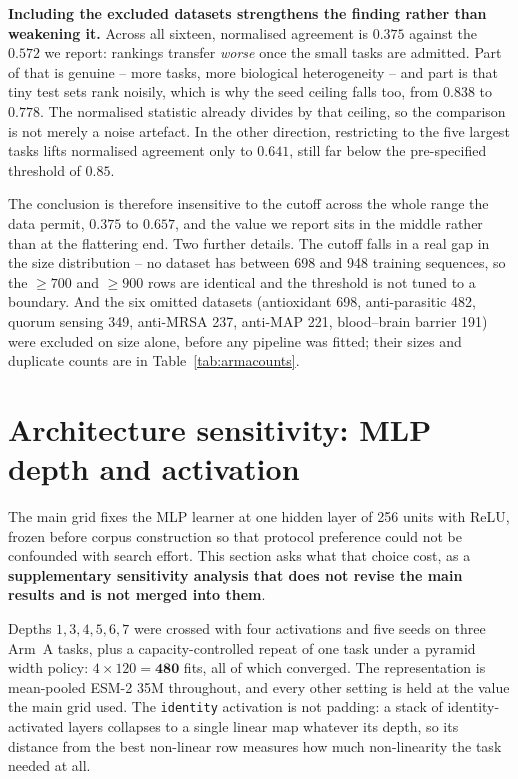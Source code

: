 \documentclass[11pt,a4paper]{article}
\begin{document}
\textbf{Including the excluded datasets strengthens the finding rather than weakening it.}
Across all sixteen, normalised agreement is $0.375$ against the $0.572$ we report: rankings
transfer \emph{worse} once the small tasks are admitted. Part of that is genuine -- more
tasks, more biological heterogeneity -- and part is that tiny test sets rank noisily, which
is why the seed ceiling falls too, from $0.838$ to $0.778$. The normalised statistic already
divides by that ceiling, so the comparison is not merely a noise artefact. In the other
direction, restricting to the five largest tasks lifts normalised agreement only to
$0.641$, still far below the pre-specified threshold of $0.85$.

The conclusion is therefore insensitive to the cutoff across the whole range the data
permit, $0.375$ to $0.657$, and the value we report sits in the middle rather than at the
flattering end. Two further details. The cutoff falls in a real gap in the size
distribution -- no dataset has between 698 and 948 training sequences, so the $\geq 700$ and
$\geq 900$ rows are identical and the threshold is not tuned to a boundary. And the six
omitted datasets (antioxidant 698, anti-parasitic 482, quorum sensing 349, anti-MRSA 237,
anti-MAP 221, blood--brain barrier 191) were excluded on size alone, before any pipeline was
fitted; their sizes and duplicate counts are in Table~\ref{tab:armacounts}.

\section{Architecture sensitivity: MLP depth and activation}
\label{sec:ablation}

The main grid fixes the MLP learner at one hidden layer of 256 units with ReLU, frozen
before corpus construction so that protocol preference could not be confounded with search
effort. This section asks what that choice cost, as a \textbf{supplementary sensitivity
analysis that does not revise the main results and is not merged into them}.

Depths $1, 3, 4, 5, 6, 7$ were crossed with four activations and five seeds on three Arm~A
tasks, plus a capacity-controlled repeat of one task under a pyramid width policy:
$4 \times 120 = \mathbf{480}$ fits, all of which converged. The representation is
mean-pooled ESM-2 35M throughout, and every other setting is held at the value the main
grid used. The \texttt{identity} activation is not padding: a stack of identity-activated
layers collapses to a single linear map whatever its depth, so its distance from the best
non-linear row measures how much non-linearity the task needed at all.
\end{document}
